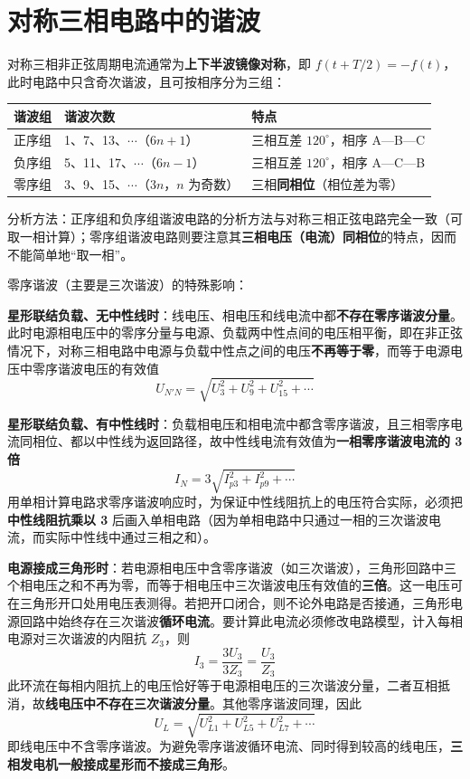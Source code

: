 \section{对称三相电路中的谐波}
对称三相非正弦周期电流通常为\textbf{上下半波镜像对称}，即 $f\left(t+T/2\right)=-f(t)$，此时电路中只含奇次谐波，且可按相序分为三组：

\begin{center}
\begin{tabular}{@{}lll@{}}
\toprule
谐波组 & 谐波次数 & 特点 \\
\midrule
正序组 & 1、7、13、$\cdots$（$6n+1$） & 三相互差 $120^\circ$，相序 A—B—C \\
负序组 & 5、11、17、$\cdots$（$6n-1$） & 三相互差 $120^\circ$，相序 A—C—B \\
零序组 & 3、9、15、$\cdots$（$3n$，$n$ 为奇数） & 三相\textbf{同相位}（相位差为零）\\
\bottomrule
\end{tabular}
\end{center}

分析方法：正序组和负序组谐波电路的分析方法与对称三相正弦电路完全一致（可取一相计算）；零序组谐波电路则要注意其\textbf{三相电压（电流）同相位}的特点，因而不能简单地“取一相”。

零序谐波（主要是三次谐波）的特殊影响：

\textbf{星形联结负载、无中性线时}：线电压、相电压和线电流中都\textbf{不存在零序谐波分量}。此时电源相电压中的零序分量与电源、负载两中性点间的电压相平衡，即在非正弦情况下，对称三相电路中电源与负载中性点之间的电压\textbf{不再等于零}，而等于电源电压中零序谐波电压的有效值
\begin{equation}
U_{N'N}=\sqrt{U_3^2+U_9^2+U_{15}^2+\cdots}
\end{equation}

\textbf{星形联结负载、有中性线时}：负载相电压和相电流中都含零序谐波，且三相零序电流同相位、都以中性线为返回路径，故中性线电流有效值为\textbf{一相零序谐波电流的 3 倍}
\begin{equation}
I_N=3\sqrt{I_{p3}^2+I_{p9}^2+\cdots}
\end{equation}
用单相计算电路求零序谐波响应时，为保证中性线阻抗上的电压符合实际，必须把\textbf{中性线阻抗乘以 3} 后画入单相电路（因为单相电路中只通过一相的三次谐波电流，而实际中性线中通过三相之和）。

\textbf{电源接成三角形时}：若电源相电压中含零序谐波（如三次谐波），三角形回路中三个相电压之和不再为零，而等于相电压中三次谐波电压有效值的\textbf{三倍}。这一电压可在三角形开口处用电压表测得。若把开口闭合，则不论外电路是否接通，三角形电源回路中始终存在三次谐波\textbf{循环电流}。要计算此电流必须修改电路模型，计入每相电源对三次谐波的内阻抗 $Z_3$，则
\begin{equation}
I_3=\frac{3U_3}{3Z_3}=\frac{U_3}{Z_3}
\end{equation}
此环流在每相内阻抗上的电压恰好等于电源相电压的三次谐波分量，二者互相抵消，故\textbf{线电压中不存在三次谐波分量}。其他零序谐波同理，因此
\begin{equation}
U_L=\sqrt{U_{L1}^2+U_{L5}^2+U_{L7}^2+\cdots}
\end{equation}
即线电压中不含零序谐波。为避免零序谐波循环电流、同时得到较高的线电压，\textbf{三相发电机一般接成星形而不接成三角形}。

